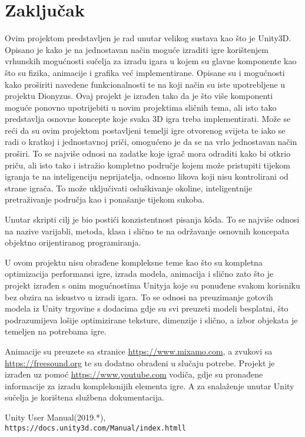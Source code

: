 \section{Zaključak}
Ovim projektom predstavljen je rad unutar velikog sustava kao što je Unity3D.
Opisano je kako je na jednostavan način moguće izraditi igre korištenjem vrhunskih
mogućnosti sučelja za izradu igara u kojem su glavne komponente kao što su fizika,
animacije i grafika već implementirane. Opisane su i mogućnosti kako proširiti
navedene funkcionalnosti te na koji način su iste upotrebljene u projektu Dionyzus.
Ovaj projekt je izrađen tako da je što više komponenti moguće ponovno upotrijebiti u
novim projektima sličnih tema, ali isto tako predstavlja osnovne koncepte koje svaka
3D igra treba implementirati. 
Može se reći da su ovim projektom postavljeni temelji igre otvorenog svijeta te iako
se radi o kratkoj i jednostavnoj priči, omogućeno je da se na vrlo jednostavan način
proširi. To se najviše odnosi na zadatke koje igrač mora odraditi kako bi otkrio
priču, ali isto tako i istražio kompletno područje kojem može pristupiti tijekom
igranja te na inteligenciju neprijatelja, odnosno likova koji nisu kontrolirani od
strane igrača. To može uključivati osluškivanje okoline, inteligentnije
pretraživanje područja kao i ponašanje tijekom sukoba.

Unutar skripti cilj je bio postići konzistentnost pisanja k\^oda. To se najviše
odnosi na nazive varijabli, metoda, klasa i slično te na održavanje osnovnih
koncepata objektno orijentiranog programiranja.

U ovom projektu nisu obrađene kompleksne teme kao što su kompletna optimizacija
performansi igre, izrada modela, animacija i slično zato što je projekt izrađen s
onim mogućnostima Unityja koje su ponuđene svakom korisniku bez obzira na iskustvo u
izradi igara. To se odnosi na preuzimanje gotovih modela iz Unity trgovine s
dodacima gdje su svi preuzeti modeli besplatni, što podrazumijeva lošije
optimizirane teksture, dimenzije i slično, a izbor objekata je temeljen na potrebama
igre.

Animacije su preuzete sa stranice \url{https://www.mixamo.com}, a
zvukovi sa \url{https://freesound.org} te su dodatno obrađeni u slučaju potrebe.
Projekt je izrađen uz pomoć \url{https://www.youtube.com} vodiča, gdje su pronađene
informacije za izradu kompleksnijih elementa igre. A za snalaženje unutar Unity
sučelja je korištena službena dokumentacija.
\begin{thebibliography}{9}
Unity User Manual(2019.*),
\\\texttt{https://docs.unity3d.com/Manual/index.htmll}
\end{thebibliography}